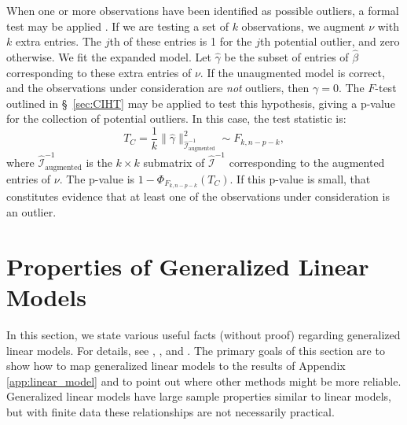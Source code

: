 \documentclass[12pt]{article}
\begin{document}
When one or more observations have been identified as possible outliers, a formal test may be applied \cite[\S~10.6.4]{Seber:2003}. If we are testing a set of $k$ observations, we augment $\nu$ with $k$ extra entries. The $j$th of these entries is 1 for the $j$th potential outlier, and zero otherwise. We fit the expanded model. Let $\hat{\gamma}$ be the subset of entries of $\hat{\beta}$ corresponding to these extra entries of $\nu$. If the unaugmented model is correct, and the observations under consideration are \textit{not} outliers, then $\gamma = 0$. The $F$-test outlined in \S~\ref{sec:CIHT} may be applied to test this hypothesis, giving a p-value for the collection of potential outliers. In this case, the test statistic is:
\begin{displaymath}
   T_C = \frac{1}{k} \| \hat{\gamma} \|_{\hat{\mathcal{I}}_{\textrm{augmented}}^{-1}}^2 \sim F_{k, n-p-k},
\end{displaymath}
where $\hat{\mathcal{I}}_{\textrm{augmented}}^{-1}$ is the $k \times k$ submatrix of $\hat{\mathcal{I}}^{-1}$ corresponding to the augmented entries of $\nu$. The p-value is $1 - \Phi_{F_{k, n-p-k}}(T_C)$. If this p-value is small, that constitutes evidence that at least one of the observations under consideration is an outlier.

\section{Properties of Generalized Linear Models}
\label{app:glm}

In this section, we state various useful facts (without proof) regarding generalized linear models. For details, see \cite{MN:1983}, \cite{Wood:2017}, and \cite{Agresti:2012}. The primary goals of this section are to show how to map generalized linear models to the results of Appendix \ref{app:linear_model} and to point out where other methods might be more reliable. Generalized linear models have large sample properties similar to linear models, but with finite data these relationships are not necessarily practical.
\end{document}
